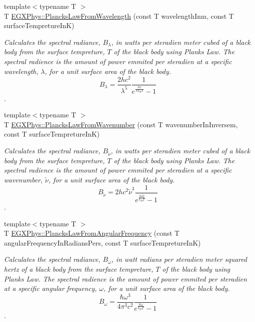 \begin{DoxyCompactItemize}
{\footnotesize template$<$typename T $>$ }\\T \mbox{\hyperlink{group___e_g_x_phys-_electrodynamics-_black_body-_plancks_law_ga54639bc031ded51ef78aa82b0457a4dd}{E\+G\+X\+Phys\+::\+Plancks\+Law\+From\+Wavelength}} (const T wavelength\+Inm, const T surface\+Tempreture\+InK)
\begin{DoxyCompactList}\small\item\em Calculates the spectral radiance, $B_{\lambda}$, in watts per steradien meter cubed of a black body from the surface tempreture, $T$ of the black body using Plank\textquotesingle{}s Law. The spectral radience is the amount of power emmited per steradien at a specific wavelength, $\lambda$, for a unit surface area of the black body. \[ B_{\lambda} = \dfrac{2 h c^2}{\lambda^5} \dfrac{1}{e^{\frac{hc}{\lambda k_B T}} - 1} \]. \end{DoxyCompactList}\item 
{\footnotesize template$<$typename T $>$ }\\T \mbox{\hyperlink{group___e_g_x_phys-_electrodynamics-_black_body-_plancks_law_ga6648ae2a0fbff6735c1e1a04c7cac746}{E\+G\+X\+Phys\+::\+Plancks\+Law\+From\+Wavenumber}} (const T wavenumber\+In\+Inversem, const T surface\+Tempreture\+InK)
\begin{DoxyCompactList}\small\item\em Calculates the spectral radiance, $B_{\tilde {\nu }}$, in watts per steradien meter cubed of a black body from the surface tempreture, $T$ of the black body using Plank\textquotesingle{}s Law. The spectral radience is the amount of power emmited per steradien at a specific wavenumber, $\tilde {\nu }$, for a unit surface area of the black body. \[ B_{\tilde {\nu }} = 2 h c^2 \tilde {\nu }^3 \dfrac{1}{e^{\frac{hc \tilde {\nu }}{k_B T}} - 1} \]. \end{DoxyCompactList}\item 
{\footnotesize template$<$typename T $>$ }\\T \mbox{\hyperlink{group___e_g_x_phys-_electrodynamics-_black_body-_plancks_law_gaac540560c71e30c02b91d22e417b5863}{E\+G\+X\+Phys\+::\+Plancks\+Law\+From\+Angular\+Frequency}} (const T angular\+Frequency\+In\+Radians\+Pers, const T surface\+Tempreture\+InK)
\begin{DoxyCompactList}\small\item\em Calculates the spectral radiance, $B_{\omega}$, in watt radians per steradien meter squared hertz of a black body from the surface tempreture, $T$ of the black body using Plank\textquotesingle{}s Law. The spectral radience is the amount of power emmited per steradien at a specific angular frequency, $\omega$, for a unit surface area of the black body. \[ B_{\omega} = \dfrac{\hbar \omega^3}{4\pi^3c^2} \dfrac{1}{e^{\frac{\hbar\omega}{k_B T}} - 1} \]. \end{DoxyCompactList}\item 

\end{DoxyCompactItemize}
